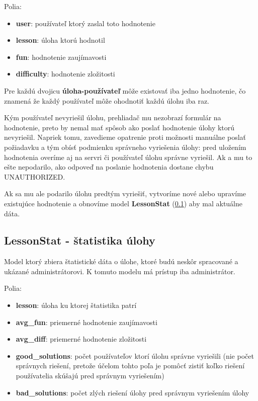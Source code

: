 Polia:
\begin{itemize}
\item \textbf{user}: používateľ ktorý zaslal toto hodnotenie
\item \textbf{lesson}: úloha ktorú hodnotil
\item \textbf{fun}: hodnotenie zaujímavosti
\item \textbf{difficulty}: hodnotenie zložitosti
\end{itemize}

Pre každú dvojicu \textbf{úloha-používateľ} môže existovať iba jedno hodnotenie,
čo znamená že každý používateľ môže ohodnotiť každú úlohu iba raz.

Kým používateľ nevyriešil úlohu, prehliadač mu nezobrazí formulár na hodnotenie,
preto by nemal mať spôsob ako poslať hodnotenie úlohy ktorú nevyriešil.
Napriek tomu, zavedieme opatrenie proti
možnosti manuálne poslať požiadavku a tým obísť podmienku správneho vyriešenia úlohy:
pred uložením hodnotenia overíme aj na servri či používateľ úlohu správne vyriešil.
Ak a mu to ešte nepodarilo, ako odpoveď na poslanie hodnotenia dostane chybu UNAUTHORIZED.

 Ak sa mu ale podarilo úlohu predtým
vyriešiť, vytvoríme nové alebo upravíme existujúce hodnotenie a obnovíme model \textbf{LessonStat} (\ref{modelLessonStat})
aby mal aktuálne dáta.
\subsection{LessonStat - štatistika úlohy}
\label{modelLessonStat}
Model ktorý zbiera štatistické dáta o úlohe, ktoré budú neskôr spracované a ukázané administrátorovi.
K tomuto modelu má prístup iba administrátor.

Polia:
\begin{itemize}
\item \textbf{lesson}: úloha ku ktorej štatistika patrí
\item \textbf{avg\_fun}: priemerné hodnotenie zaujímavosti
\item \textbf{avg\_diff}: priemerné hodnotenie zložitosti
\item \textbf{good\_solutions}: počet používateľov ktorí úlohu správne vyriešili
  (nie počet správnych riešení, pretože účelom tohto poľa je pomôcť zistiť koľko riešení
  používatelia skúšajú pred správnym vyriešením)
\item \textbf{bad\_solutions}: počet zlých riešení úlohy pred správnym vyriešením úlohy
\end{itemize}

